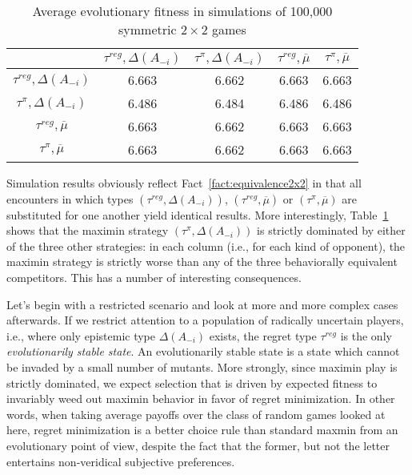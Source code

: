 \documentclass[fleqn,reqno,11pt]{article}
\begin{document}
\begin{table}[t]
\centering
\begin{tabular}{ccccc}
  \toprule
 & $\tau^{reg}, \Delta(A_{-i})$ 
 & $\tau^{\pi}, \Delta(A_{-i})$ 
 & $\tau^{reg}, \overline{\mu}$ 
 & $\tau^{\pi}, \overline{\mu}$ \\ 
  \midrule
  $\tau^{reg}, \Delta(A_{-i})$ & 6.663 & 6.662 & 6.663 & 6.663 \\ 
  $\tau^{\pi}, \Delta(A_{-i})$ & 6.486 & 6.484 & 6.486 & 6.486 \\ 
  $\tau^{reg}, \overline{\mu}$ & 6.663 & 6.662 & 6.663 & 6.663 \\  
  $\tau^{\pi}, \overline{\mu}$ & 6.663 & 6.662 & 6.663 & 6.663 \\ 
   \bottomrule
\end{tabular}                    
\caption{Average evolutionary fitness in simulations of 100,000 symmetric $2 \times 2$ games}
\label{tab:ExpectedFitness_4Types}
\end{table}

Simulation results obviously reflect Fact~\ref{fact:equivalence2x2} in that all encounters in
which types $(\tau^{reg}, \Delta(A_{-i}))$, $(\tau^{reg}, \overline{\mu})$ or
$(\tau^{\pi}, \overline{\mu})$ are substituted for one another yield identical results. More
interestingly, Table~\ref{tab:ExpectedFitness_4Types} shows that the maximin strategy
$(\tau^{\pi}, \Delta(A_{-i}))$ is strictly dominated by either of the three other strategies:
in each column (i.e., for each kind of opponent), the maximin strategy is strictly worse
than any of the three behaviorally equivalent competitors. This has a number of interesting
consequences.

Let's begin with a restricted scenario and look at more and more complex cases afterwards. If
we restrict attention to a population of radically uncertain players, i.e., where only
epistemic type $\Delta(A_{-i})$ exists, the regret type $ \tau^{reg} $ is the only
\emph{evolutionarily stable state}. An evolutionarily stable state is a state which cannot be
invaded by a small number of mutants. More strongly, since maximin play is strictly dominated,
we expect selection that is driven by expected fitness to invariably weed out maximin behavior
in favor of regret minimization. In other words, when taking average payoffs over the class of
random games looked at here, regret minimization is a better choice rule than standard maxmin
from an evolutionary point of view, despite the fact that the former, but not the letter
entertains non-veridical subjective preferences.
\end{document}

